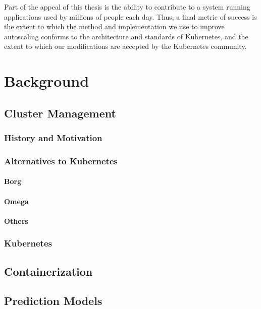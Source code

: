 \documentclass[twoside]{report}
\begin{document}
Part of the appeal of this thesis is the ability to contribute to a
system running applications used by millions of people each day.
Thus, a final metric of success is the extent to which the method and
implementation we use to improve autoscaling conforms to
the architecture and standards of Kubernetes, and the extent to which our
modifications are accepted by the Kubernetes community.


\chapter{Background}

\section{Cluster Management}

\subsection{History and Motivation}

\subsection{Alternatives to Kubernetes}

\subsubsection{Borg}

\subsubsection{Omega}

\subsubsection{Others}

\subsection{Kubernetes}

\section{Containerization}

\section{Prediction Models}



\end{document}
